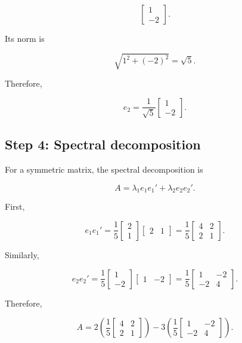 \documentclass[12pt]{article}
\begin{document}
\[
\begin{bmatrix}
1\\
-2
\end{bmatrix}.
\]

Its norm is

\[
\sqrt{1^2+(-2)^2}
=
\sqrt{5}.
\]

Therefore,

\[
\boxed{
e_2=
\frac{1}{\sqrt{5}}
\begin{bmatrix}
1\\
-2
\end{bmatrix}
}.
\]

\subsection*{Step 4: Spectral decomposition}

For a symmetric matrix, the spectral decomposition is

\[
A=\lambda_1e_1e_1'+\lambda_2e_2e_2'.
\]

First,

\[
e_1e_1'
=
\frac{1}{5}
\begin{bmatrix}
2\\
1
\end{bmatrix}
\begin{bmatrix}
2&1
\end{bmatrix}
=
\frac{1}{5}
\begin{bmatrix}
4&2\\
2&1
\end{bmatrix}.
\]

Similarly,

\[
e_2e_2'
=
\frac{1}{5}
\begin{bmatrix}
1\\
-2
\end{bmatrix}
\begin{bmatrix}
1&-2
\end{bmatrix}
=
\frac{1}{5}
\begin{bmatrix}
1&-2\\
-2&4
\end{bmatrix}.
\]

Therefore,

\[
A
=
2
\left(
\frac{1}{5}
\begin{bmatrix}
4&2\\
2&1
\end{bmatrix}
\right)
-
3
\left(
\frac{1}{5}
\begin{bmatrix}
1&-2\\
-2&4
\end{bmatrix}
\right).
\]
\end{document}

